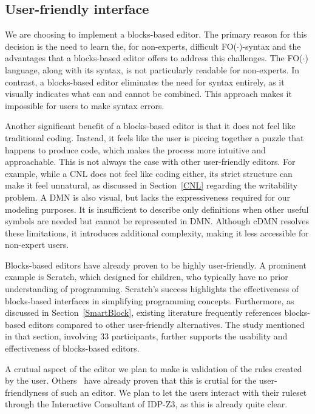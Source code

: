 \documentclass[11pt,a4paper]{report}
\newcommand{\fodot}{FO($\cdot$)\xspace}
\begin{document}
\subsection{User-friendly interface}
We are choosing to implement a blocks-based editor. The primary reason for this decision is the need to learn the, for non-experts, difficult \fodot-syntax and the advantages that a blocks-based editor offers to address this challenges. The \fodot language, along with its syntax, is not particularly readable for non-experts. In contrast, a blocks-based editor eliminates the need for syntax entirely, as it visually indicates what can and cannot be combined. This approach makes it impossible for users to make syntax errors.

Another significant benefit of a blocks-based editor is that it does not feel like traditional coding. Instead, it feels like the user is piecing together a puzzle that happens to produce code, which makes the process more intuitive and approachable. This is not always the case with other user-friendly editors. For example, while a CNL does not feel like coding either, its strict structure can make it feel unnatural, as discussed in Section~\ref{CNL} regarding the writability problem. A DMN is also visual, but lacks the expressiveness required for our modeling purposes. It is insufficient to describe only definitions when other useful symbols are needed but cannot be represented in DMN. Although cDMN resolves these limitations, it introduces additional complexity, making it less accessible for non-expert users.

Blocks-based editors have already proven to be highly user-friendly. A prominent example is Scratch, which designed for children, who typically have no prior understanding of programming. Scratch’s success highlights the effectiveness of blocks-based interfaces in simplifying programming concepts. Furthermore, as discussed in Section~\ref{SmartBlock}, existing literature frequently references blocks-based editors compared to other user-friendly alternatives. The study mentioned in that section, involving 33 participants, further supports the usability and effectiveness of blocks-based editors.

A crutual aspect of the editor we plan to make is validation of the rules created by the user. Others~\cite{SOTA_AutomationConfigurationSmarthome} have already proven that this is crutial for the user-friendlyness of such an editor. We plan to let the users interact with their ruleset through the Interactive Consultant of IDP-Z3, as this is already quite clear.
\end{document}
